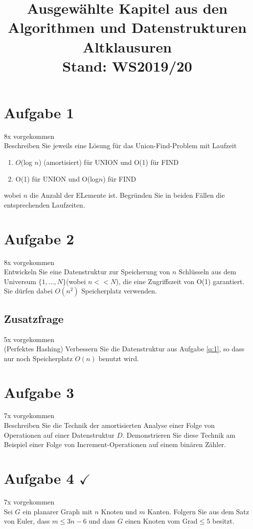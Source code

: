 \documentclass[10pt,a4paper]{article}
\author{}
\date{}
\title{{\Huge \textbf{Ausgewählte Kapitel aus den Algorithmen und Datenstrukturen Altklausuren}} \\ Stand: WS2019/20}
\begin{document}
	\maketitle
	
\section*{Aufgabe 1} 
	8x vorgekommen \\
	Beschreiben Sie jeweils eine Lösung für das Union-Find-Problem mit Laufzeit
	\begin{enumerate}
		\item $O$(log $n$) (amortisiert) für UNION und O(1) für FIND
		\item O(1) für UNION und O(log$n$) für FIND
	\end{enumerate}	
	wobei $n$ die Anzahl der ELemente ist. Begründen Sie in beiden Fällen die entsprechenden Laufzeiten.
	
\section*{Aufgabe 2}\label{q:1} 
	8x vorgekommen \\
	Entwickeln Sie eine Datenstruktur zur Speicherung von $n$ Schlüsseln aus dem Universum $\{1,...,N\}$(wobei $n<<N$), die eine Zugriffszeit von O(1) garantiert. Sie dürfen dabei $O(n^2)$ Speicherplatz verwenden.
\subsection*{Zusatzfrage} 
	5x vorgekommen \\
	(Perfektes Hashing) Verbessern Sie die Datenstruktur aus Aufgabe \ref{q:1}, so dass nur noch Speicherplatz $O(n)$ benutzt wird.
	
\section*{Aufgabe 3} 
	7x vorgekommen \\
	Beschreiben Sie die Technik der amortisierten Analyse einer Folge von Operationen auf einer Datenstruktur $D$. Demonstrieren Sie diese Technik am Beispiel einer Folge von Increment-Operationen auf einem binären Zähler.
	
\section*{Aufgabe 4 $\checkmark$}\label{q:2}
	7x vorgekommen \\
	Sei $G$ ein planarer Graph mit $n$ Knoten und $m$ Kanten. Folgern Sie aus dem Satz von Euler, dass $m\leq3n-6$ und dass $G$ einen Knoten vom Grad$\leq5$ besitzt.
\end{document}
